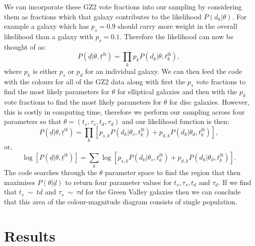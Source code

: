 \documentclass{mn2e}
\begin{document}
We can incorporate these GZ2 vote fractions  into our sampling by considering them as fractions which that galaxy contributes to the likelihood $P(d_{k}|\theta)$. For example a galaxy which has $p_{s} = 0.9$ should carry more weight in the overall likelihood than a galaxy with $p_{s} = 0.1$. Therefore the likelihood can now be thought of as:
\begin{equation*}
P(\underline{d}|\theta, \underline{t}^{lb}) = \prod_{k} p_{k} P(d_{k}|\theta, t_{k}^{lb}),
\end{equation*}
where $p_{k}$ is either $p_{s}$ or $p_{d}$ for an individual galaxy. We can then feed the code with the colours for all of the GZ2 data along with first the $p_{s}$ vote fractions to find the most likely parameters for $\theta$ for elliptical galaxies and then with the $p_{d}$ vote fractions to find the most likely parameters for $\theta$ for disc galaxies. However, this is costly in computing time, therefore we perform our sampling across four parameters so that $\theta = (t_{s}, \tau_{s}, t_{d}, \tau_{d})$ and our likelihood function is then:
\begin{equation*}
P(\underline{d}|\theta, \underline{t}^{lb}) = \prod_{k} \left [p_{s, k} P(d_{k}|\theta_{s}, t_{k}^{lb}) + p_{d, k} P(d_{k}|\theta_{d}, t_{k}^{lb}) \right],
\end{equation*}
or,
\begin{equation*}
\log \left[ P(\underline{d}|\theta, \underline{t}^{lb}) \right] = \sum_{k} \log \left [p_{s, k} P(d_{k}|\theta_{s}, t_{k}^{lb}) + p_{d, k} P(d_{k}|\theta_{d}, t_{k}^{lb}) \right]. 
\end{equation*}
The code searches through the $\theta$ parameter space to find the region that then maximises $P(\theta|\underline{d})$ to return four parameter values for $t_{s}, \tau_{s}, t_{d}$ and $\tau_{d}$. If we find that $t_{s}~\sim~t{d}$ and $\tau_{s} ~\sim~ \tau{d}$ for the Green Valley galaxies then we can conclude that this area of the colour-magnitude diagram consists of  single population. 




\section{Results}
\end{document}
